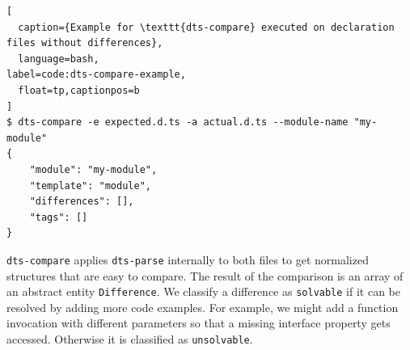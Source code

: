 \documentclass[sigconf]{acmart}
\begin{document}
\begin{lstlisting}[
  caption={Example for \texttt{dts-compare} executed on declaration files without differences},
  language=bash,
label=code:dts-compare-example,
  float=tp,captionpos=b
]
$ dts-compare -e expected.d.ts -a actual.d.ts --module-name "my-module"
{
    "module": "my-module",
    "template": "module",
    "differences": [],
    "tags": []
}
\end{lstlisting}

\texttt{dts-compare} applies \texttt{dts-parse} internally to both files to get 
normalized structures that are easy to compare. The result of the comparison is an array
of an abstract entity \texttt{Difference}. 
We classify a difference as \texttt{solvable} if it can be resolved by adding more code
examples. For example, we might add a function invocation with different parameters so that a missing
interface property gets accessed. Otherwise it is classified as  \texttt{unsolvable}. 
\end{document}
